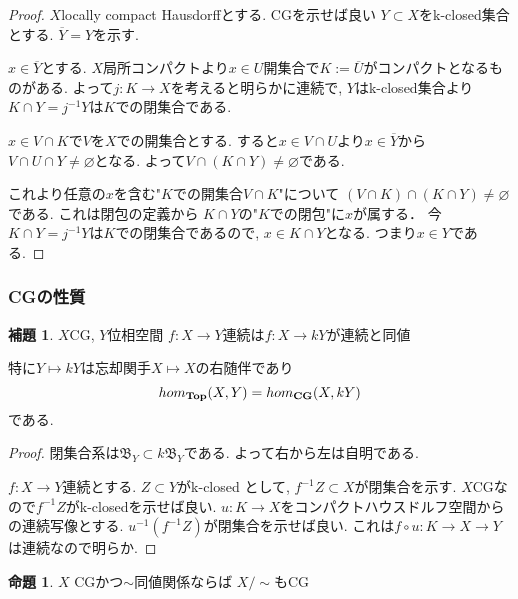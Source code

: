 \documentclass[dvipdfmx,a4paper,11pt]{article}
\theoremstyle{definition}
\newtheorem{lem}[thm]{補題}
\newtheorem{prop}[thm]{命題}
\begin{document}
\begin{proof}
 $X$locally compact Hausdorffとする.
CGを示せば良い
$Y \subset X$をk-closed集合とする.
$\overline{Y} = Y$を示す.

$x \in \overline{Y}$とする.
$X$局所コンパクトより$x \in U$開集合で$K:= \overline{U}$がコンパクトとなるものがある.
よって$j : K \to X$を考えると明らかに連続で, $Y$はk-closed集合より$K\cap Y = j^{-1}Y$は$K$での閉集合である.

$x \in V \cap K$で$V$を$X$での開集合とする.
すると$x \in V \cap U$より$x \in \overline{Y}$から
$V \cap U \cap Y \neq\varnothing$となる.
よって$V \cap (K \cap Y)\neq\varnothing$である.

これより任意の$x$を含む"$K$での開集合$V \cap K$"について
$(V \cap K) \cap  (K \cap Y) \neq \varnothing$である.
これは閉包の定義から
$K \cap Y$の"$K$での閉包"に$x$が属する．
今$K\cap Y = j^{-1}Y$は$K$での閉集合であるので, $x \in K \cap Y$となる. 
つまり$x \in Y$である. 
\end{proof}


\subsubsection{CGの性質}


 \begin{tcolorbox}
 [colback = white, colframe = green!35!black, fonttitle = \bfseries,breakable = true]
\begin{lem}\cite[Cor1.10]{Str}
\label{Str-cor1.10}
$X$CG, $Y$位相空間
$f : X \to Y$連続は$f : X \to kY$が連続と同値

特に$Y \mapsto kY$は忘却関手$X \mapsto X$の右随伴であり
$$
hom_{{\bf Top}}(X, Y) = hom_{{\bf CG}}(X, kY)
$$
である. 
\end{lem}
\end{tcolorbox}

\begin{proof}
閉集合系は$\mathfrak{B}_Y \subset k\mathfrak{B}_Y$である.
よって右から左は自明である.

$f : X \to Y$連続とする. $Z \subset Y$がk-closed として, $f^{-1}Z \subset X$が閉集合を示す.
$X$CGなので$f^{-1}Z$がk-closedを示せば良い.
$u : K \to X$をコンパクトハウスドルフ空間からの連続写像とする.
$u^{-1}(f^{-1}Z )$が閉集合を示せば良い. これは$f \circ u : K \to X \to Y$は連続なので明らか.
\end{proof}




 \begin{tcolorbox}
 [colback = white, colframe = green!35!black, fonttitle = \bfseries,breakable = true]
\begin{prop}\cite[Prop2.1]{Str}
\label{Str-prop2.1}
$X$ CGかつ$\sim$同値関係ならば
$X/\sim$もCG
\end{prop}
\end{tcolorbox}
\end{document}
